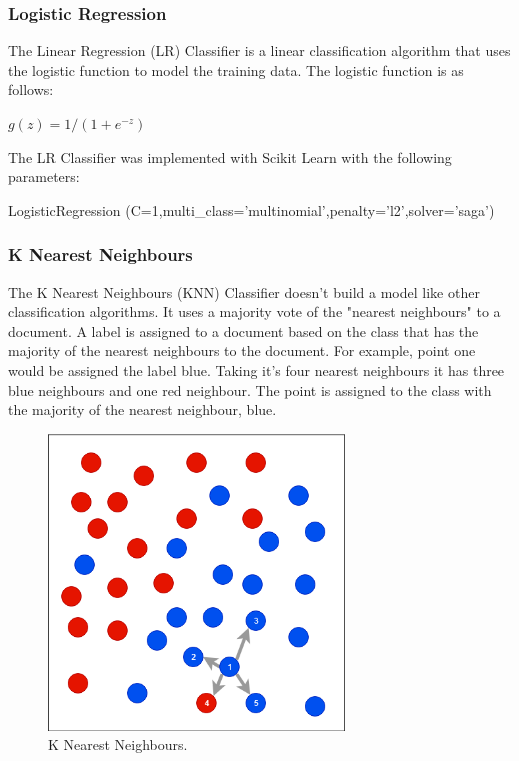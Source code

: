 \subsubsection*{Logistic Regression}

The Linear Regression (LR) Classifier is a linear classification algorithm that uses the logistic function to model the training data. The logistic function is as follows:
\begin{center}
  \(g(z)=1/(1+e^{-z})\)  
\end{center}

The LR Classifier was implemented with Scikit Learn with the following parameters:

\begin{tcolorbox}
\begin{center}
	LogisticRegression (C=1,multi\_class='multinomial',penalty='l2',solver='saga')
\end{center}
\end{tcolorbox}

\subsubsection*{K Nearest Neighbours}

The K Nearest Neighbours (KNN) Classifier doesn't build a model like other classification algorithms. It uses a majority vote of the "nearest neighbours" to a document. A label is assigned to a document based on the class that has the majority of the nearest neighbours to the document. For example, point one would be assigned the label blue. Taking it's four nearest neighbours it has three blue neighbours and one red neighbour. The point is assigned to the class with the majority of the nearest neighbour, blue.

\begin{figure}[h!]
\centering
\includegraphics[width=0.7\textwidth]{design_and_methodology/knn.png}
\caption{\label{fig:knn} K Nearest Neighbours.}
\end{figure}

